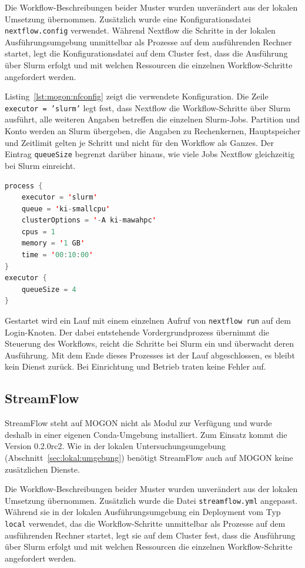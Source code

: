 Die Workflow-Beschreibungen beider Muster wurden unverändert aus der lokalen Umsetzung übernommen. Zusätzlich wurde eine Konfigurationsdatei
\texttt{nextflow.config} verwendet.
Während Nextflow die Schritte in der lokalen Ausführungsumgebung unmittelbar als Prozesse auf dem ausführenden Rechner startet, legt die Konfigurationsdatei auf dem Cluster fest, dass die Ausführung über Slurm erfolgt und mit welchen Ressourcen die einzelnen Workflow-Schritte angefordert werden.

Listing~\ref{lst:mogon:nfconfig} zeigt die verwendete
Konfiguration. Die Zeile \texttt{executor = 'slurm'} legt fest, dass Nextflow die Workflow-Schritte über Slurm ausführt, alle weiteren Angaben betreffen die einzelnen Slurm-Jobs. Partition und Konto werden an Slurm übergeben, die
Angaben zu Rechenkernen, Hauptspeicher und Zeitlimit gelten je
Schritt und nicht für den Workflow als Ganzes. Der Eintrag
\texttt{queueSize} begrenzt darüber hinaus, wie viele Jobs Nextflow
gleichzeitig bei Slurm einreicht. 

\begin{lstlisting}[language=Java,
  caption={Konfiguration von Nextflow für die Ausführung auf MOGON},
  label={lst:mogon:nfconfig}]
process {
    executor = 'slurm'
    queue = 'ki-smallcpu'
    clusterOptions = '-A ki-mawahpc'
    cpus = 1
    memory = '1 GB'
    time = '00:10:00'
}
executor {
    queueSize = 4
}
\end{lstlisting}

Gestartet wird ein Lauf mit einem einzelnen Aufruf von
\texttt{nextflow run} auf dem Login-Knoten. Der dabei entstehende
Vordergrundprozess übernimmt die Steuerung des Workflows, reicht die
Schritte bei Slurm ein und überwacht deren Ausführung. Mit dem Ende
dieses Prozesses ist der Lauf abgeschlossen, es bleibt kein Dienst
zurück. Bei Einrichtung und Betrieb traten keine Fehler auf.


\subsection{StreamFlow}
\label{sec:mogon:streamflow}

StreamFlow steht auf MOGON nicht als Modul zur Verfügung und wurde
deshalb in einer eigenen Conda-Umgebung installiert.
Zum Einsatz kommt die Version 0.2.0rc2. Wie in der lokalen
Untersuchungsumgebung (Abschnitt~\ref{sec:lokal:umgebung}) benötigt
StreamFlow auch auf MOGON keine zusätzlichen Dienste.

Die Workflow-Beschreibungen beider Muster wurden unverändert aus der 
lokalen Umsetzung übernommen. Zusätzlich wurde die Datei \texttt{streamflow.yml} angepasst. Während sie in der lokalen Ausführungsumgebung ein Deployment vom Typ \texttt{local} verwendet,
das die Workflow-Schritte unmittelbar als Prozesse auf dem ausführenden Rechner startet, legt sie auf dem Cluster fest, dass die Ausführung über Slurm erfolgt und mit welchen Ressourcen die einzelnen Workflow-Schritte angefordert werden.

